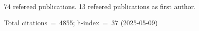 74 refereed publications. 13 refeered publications as first author.

Total citations~=~4855; h-index~=~37 (2025-05-09)